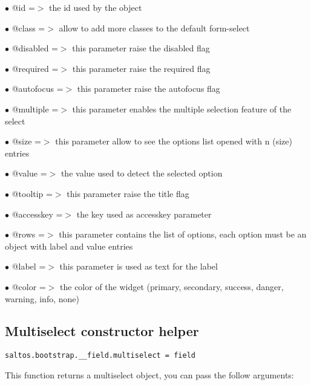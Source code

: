 \documentclass[a4paper]{book}
\begin{document}
\begin{compactitem}
\item[\color{myblue}$\bullet$] @id        =$>$ the id used by the object
\item[\color{myblue}$\bullet$] @class     =$>$ allow to add more classes to the default form-select
\item[\color{myblue}$\bullet$] @disabled  =$>$ this parameter raise the disabled flag
\item[\color{myblue}$\bullet$] @required  =$>$ this parameter raise the required flag
\item[\color{myblue}$\bullet$] @autofocus =$>$ this parameter raise the autofocus flag
\item[\color{myblue}$\bullet$] @multiple  =$>$ this parameter enables the multiple selection feature of the select
\item[\color{myblue}$\bullet$] @size      =$>$ this parameter allow to see the options list opened with n (size) entries
\item[\color{myblue}$\bullet$] @value     =$>$ the value used to detect the selected option
\item[\color{myblue}$\bullet$] @tooltip   =$>$ this parameter raise the title flag
\item[\color{myblue}$\bullet$] @accesskey =$>$ the key used as accesskey parameter
\item[\color{myblue}$\bullet$] @rows      =$>$ this parameter contains the list of options, each option must be an object
              with label and value entries
\item[\color{myblue}$\bullet$] @label     =$>$ this parameter is used as text for the label
\item[\color{myblue}$\bullet$] @color     =$>$ the color of the widget (primary, secondary, success, danger, warning, info, none)
\end{compactitem}

\hypertarget{toc473}{}
\subsection{Multiselect constructor helper}

\begin{lstlisting}
saltos.bootstrap.__field.multiselect = field
\end{lstlisting}

This function returns a multiselect object, you can pass the follow arguments:
\end{document}
